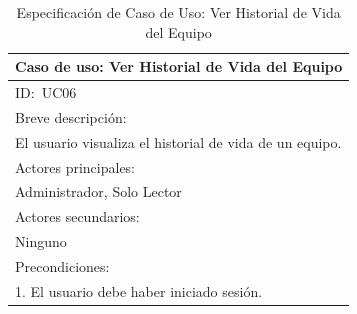 \documentclass[stu, 12pt, letterpaper, donotrepeattitle, floatsintext, natbib]{apa7}
\begin{document}
\begin{longtable}{@{} p{16.5cm} @{}}
    \caption{Especificación de Caso de Uso: Ver Historial de Vida del Equipo}\label{tab:UC06}                                                                                           \\ \toprule
    \multicolumn{1}{c}{Caso de uso: Ver Historial de Vida del Equipo}                                                                                                                   \\ \midrule
    ID:~UC06                                                                                                                                                                            \\ \midrule
    Breve descripción:                                                                                                                                                                  \\
    El usuario visualiza el historial de vida de un equipo.                                                                                                                             \\ \midrule
    Actores principales:                                                                                                                                                                \\
    Administrador, Solo Lector                                                                                                                                                          \\ \midrule
    Actores secundarios:                                                                                                                                                                \\
    Ninguno                                                                                                                                                                             \\ \midrule
    Precondiciones:                                                                                                                                                                     \\
    1. El usuario debe haber iniciado sesión.                                                                                                                                           \\ \midrule

\end{longtable}
\end{document}
